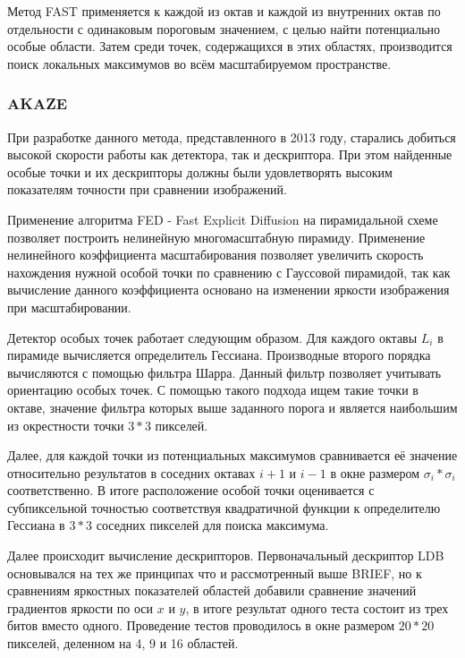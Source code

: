 Метод FAST применяется к каждой из октав и каждой из внутренних октав по отдельности с одинаковым пороговым значением, с целью найти потенциально особые области. Затем среди точек, содержащихся в этих областях, производится поиск локальных максимумов во всём масштабируемом пространстве.

\subsubsection{AKAZE}

При разработке данного метода, представленного в 2013 году, старались добиться высокой скорости работы как детектора, так и дескриптора\cite{twentytwo}. При этом найденные особые точки и их дескрипторы должны были удовлетворять высоким показателям точности при сравнении изображений.

Применение алгоритма FED - Fast Explicit Diffusion на пирамидальной схеме позволяет построить нелинейную многомасштабную пирамиду. Применение нелинейного коэффициента масштабирования позволяет увеличить скорость нахождения нужной особой точки по сравнению с Гауссовой пирамидой, так как вычисление данного коэффициента основано на изменении яркости изображения при масштабировании.

Детектор особых точек работает следующим образом. Для каждого октавы \(L_i\) в пирамиде вычисляется определитель Гессиана. Производные второго порядка вычисляются с помощью фильтра Шарра. Данный фильтр позволяет учитывать ориентацию особых точек. С помощью такого подхода ищем такие точки в октаве, значение фильтра которых выше заданного порога и является наибольшим из окрестности точки \(3*3\) пикселей.

Далее, для каждой точки из потенциальных максимумов сравнивается её значение относительно результатов в соседних октавах \(i+1\) и \(i-1\) в окне размером \(\sigma_i * \sigma_i\) соответственно. В итоге расположение особой точки оценивается с субпиксельной точностью соответствуя квадратичной функции к определителю Гессиана в \(3*3\) соседних пикселей для поиска максимума.

Далее происходит вычисление дескрипторов. Первоначальный дескриптор LDB основывался на тех же принципах что и рассмотренный выше BRIEF, но к сравнениям яркостных показателей областей добавили сравнение значений градиентов яркости по оси \(x\) и \(y\), в итоге результат одного теста состоит из трех битов вместо одного. Проведение тестов проводилось в окне размером \(20*20\) пикселей, деленном на 4, 9 и 16 областей.


